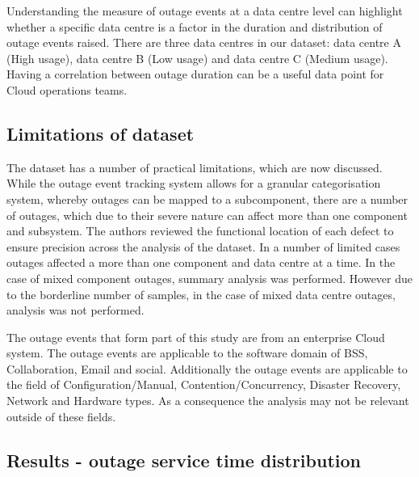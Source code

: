 Understanding the measure of outage events at a data centre level can highlight whether a specific data centre is a factor in the duration and distribution of outage events raised. There are three data centres in our dataset: data centre A (High usage), data centre B (Low usage) and data centre C (Medium usage). Having a correlation between outage duration can be a useful data point for Cloud operations teams.

\subsection{Limitations of dataset}

The dataset has a number of practical limitations, which are now discussed. While the outage event tracking system allows for a granular categorisation system, whereby outages can be mapped to a subcomponent, there are a number of outages, which due to their severe nature can affect more than one component and subsystem. The authors reviewed the functional location of each defect to ensure precision across the analysis of the dataset. In a number of limited cases outages affected a more than one component and data centre at a time. In the case of mixed component outages, summary analysis was performed. However due to the borderline number of samples, in the case of mixed data centre outages, analysis was not performed. \par

The outage events that form part of this study are from an enterprise Cloud system. The outage events are applicable to the software domain of BSS, Collaboration, Email and social. Additionally the outage events are applicable to the field of Configuration/Manual, Contention/Concurrency, Disaster Recovery, Network and Hardware types. As a consequence the analysis may not be relevant outside of these fields. 

\subsection{Results - outage service time distribution}

